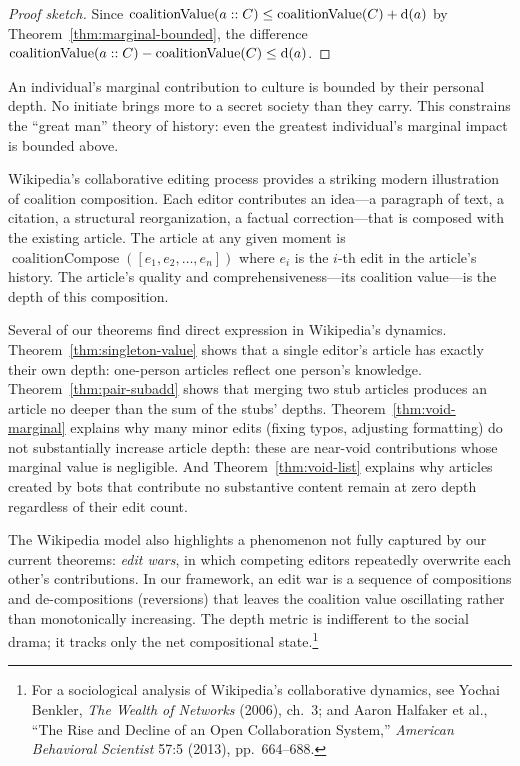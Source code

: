 \begin{proof}[Proof sketch]
Since $\operatorname{coalitionValue}(a :: C) \le
\operatorname{coalitionValue}(C) + \operatorname{d}(a)$ by
Theorem~\ref{thm:marginal-bounded}, the difference
$\operatorname{coalitionValue}(a :: C) - \operatorname{coalitionValue}(C)
\le \operatorname{d}(a)$.
\end{proof}

An individual's marginal contribution to culture is bounded by their personal
depth.  No initiate brings more to a secret society than they carry.  This
constrains the ``great man'' theory of history: even the greatest individual's
marginal impact is bounded above.

\begin{example}
\label{ex:wikipedia}
Wikipedia's collaborative editing process provides a striking modern
illustration of coalition composition.  Each editor contributes an idea---a
paragraph of text, a citation, a structural reorganization, a factual
correction---that is composed with the existing article.  The article at
any given moment is $\operatorname{coalitionCompose}([e_1, e_2, \dots, e_n])$
where $e_i$ is the $i$-th edit in the article's history.  The article's
quality and comprehensiveness---its coalition value---is the depth of
this composition.

Several of our theorems find direct expression in Wikipedia's dynamics.
Theorem~\ref{thm:singleton-value} shows that a single editor's article
has exactly their own depth: one-person articles reflect one person's
knowledge.  Theorem~\ref{thm:pair-subadd} shows that merging two stub
articles produces an article no deeper than the sum of the stubs' depths.
Theorem~\ref{thm:void-marginal} explains why many minor edits (fixing
typos, adjusting formatting) do not substantially increase article depth:
these are near-void contributions whose marginal value is negligible.
And Theorem~\ref{thm:void-list} explains why articles created by bots
that contribute no substantive content remain at zero depth regardless
of their edit count.

The Wikipedia model also highlights a phenomenon not fully captured by
our current theorems: \emph{edit wars}, in which competing editors
repeatedly overwrite each other's contributions.  In our framework, an
edit war is a sequence of compositions and de-compositions (reversions)
that leaves the coalition value oscillating rather than monotonically
increasing.  The depth metric is indifferent to the social drama; it
tracks only the net compositional state.\footnote{For a sociological
analysis of Wikipedia's collaborative dynamics, see Yochai Benkler,
\textit{The Wealth of Networks} (2006), ch.~3; and Aaron Halfaker et al.,
``The Rise and Decline of an Open Collaboration System,''
\textit{American Behavioral Scientist} 57:5 (2013), pp.\ 664--688.}
\end{example}

